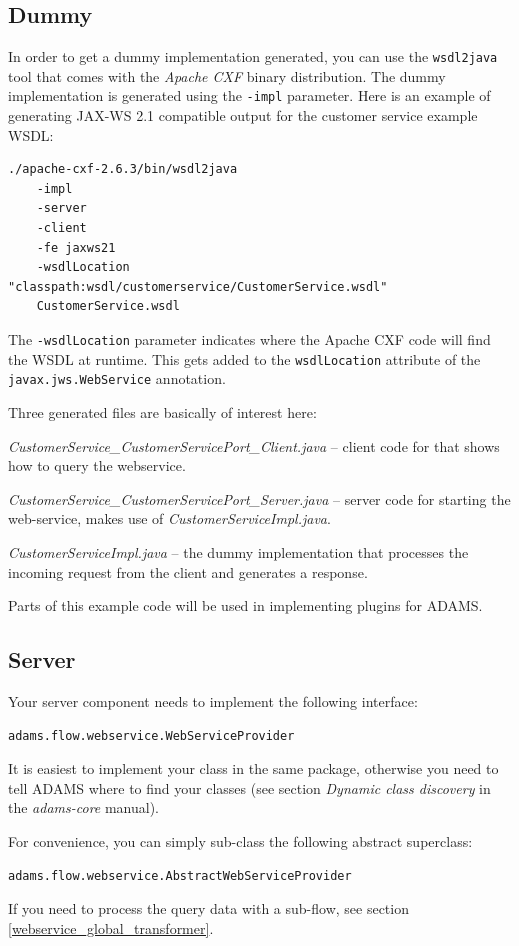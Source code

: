 \documentclass[a4paper]{book}
\begin{document}
\subsection{Dummy}
In order to get a dummy implementation generated, you can use the 
\texttt{wsdl2java} tool that comes with the \textit{Apache CXF} binary 
distribution. The dummy implementation is generated using the \texttt{-impl} 
parameter. Here is an example of generating JAX-WS 2.1 compatible output
for the customer service example WSDL:
{\scriptsize
\begin{verbatim}
./apache-cxf-2.6.3/bin/wsdl2java 
    -impl
    -server
    -client
    -fe jaxws21 
    -wsdlLocation "classpath:wsdl/customerservice/CustomerService.wsdl" 
    CustomerService.wsdl
\end{verbatim}}
The \texttt{-wsdlLocation} parameter indicates where the Apache CXF code
will find the WSDL at runtime. This gets added to the \texttt{wsdlLocation}
attribute of the \texttt{javax.jws.WebService} annotation.

Three generated files are basically of interest here:
\begin{tight_itemize}
	\item \textit{CustomerService\_CustomerServicePort\_Client.java} -- client
	code for that shows how to query the webservice.
	\item \textit{CustomerService\_CustomerServicePort\_Server.java} -- server
	code for starting the web-service, makes use of \textit{CustomerServiceImpl.java}.
	\item \textit{CustomerServiceImpl.java} -- the dummy implementation that
	processes the incoming request from the client and generates a response.
\end{tight_itemize}
Parts of this example code will be used in implementing plugins for ADAMS.

\subsection{Server}
Your server component needs to implement the following interface:
\begin{verbatim}
adams.flow.webservice.WebServiceProvider
\end{verbatim}
It is easiest to implement your class in the same package, otherwise you need
to tell ADAMS where to find your classes (see section \textit{Dynamic class 
discovery} in the \textit{adams-core} manual).

For convenience, you can simply sub-class the following abstract superclass:
\begin{verbatim}
adams.flow.webservice.AbstractWebServiceProvider
\end{verbatim}
If you need to process the query data with a sub-flow, see section 
\ref{webservice_global_transformer}.
\end{document}
